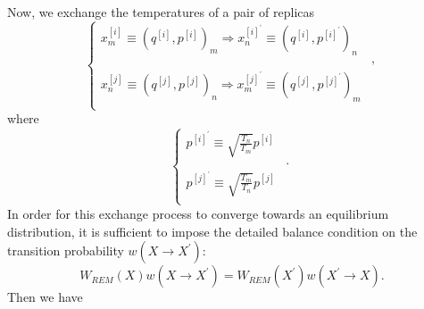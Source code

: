 Now, we exchange the temperatures of a pair of replicas
\begin{equation}
	\left\{ 
	\begin{array}{rl} 
		x_m^{[i]}\equiv \left(q^{[i]},p^{[i]}\right)_m \Rightarrow x_n^{[i]^\prime}\equiv \left(q^{[i]},p^{[i]^\prime}\right)_n&\\ 
		&,\\
		x_n^{[j]}\equiv \left(q^{[j]},p^{[j]}\right)_n \Rightarrow x_m^{[j]^\prime}\equiv \left(q^{[j]},p^{[j]^\prime}\right)_m&\\  
	\end{array} 
	\right. 
\end{equation}
where
\begin{equation}
	\left\{ 
	\begin{array}{rl} 
		p^{[i]^\prime}\equiv \sqrt{\frac{T_n}{T_m}} p^{[i]}&\\ 
		&.\\
		p^{[j]^\prime}\equiv \sqrt{\frac{T_m}{T_n}} p^{[j]}&\\  
	\end{array} 
	\right. 
\end{equation}
In order for this exchange process to converge towards an equilibrium distribution, it is sufficient to impose the detailed balance condition on the transition probability $w(X\rightarrow X^\prime)$:
\begin{equation}
	W_{REM}(X)w(X\rightarrow X^\prime) = W_{REM}(X^\prime)w(X^\prime\rightarrow X).
\end{equation}
Then we have
